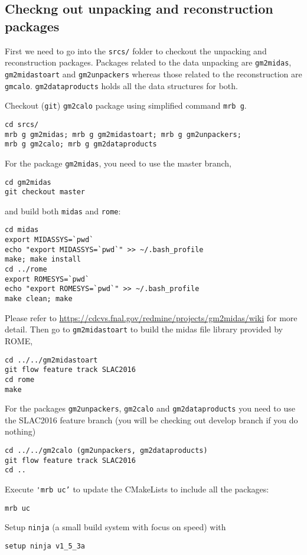 \subsection{Checkng out unpacking and reconstruction packages}
First we need to go into the \verb+srcs/+ folder to checkout the unpacking and reconstruction packages. 
Packages related to the data unpacking are \verb+gm2midas+, \verb+gm2midastoart+ and \verb+gm2unpackers+ whereas those related to the reconstruction are
\verb+gmcalo+. \verb+gm2dataproducts+ holds all the data structures for both.

Checkout (\verb+git+) \verb+gm2calo+ package using simplified command \verb+mrb g+.
%
\begin{Verbatim}[frame=single]
cd srcs/
mrb g gm2midas; mrb g gm2midastoart; mrb g gm2unpackers;
mrb g gm2calo; mrb g gm2dataproducts
\end{Verbatim}
%
For the package \verb+gm2midas+, you need to use the master branch,
%
\begin{Verbatim}[frame=single]
cd gm2midas
git checkout master
\end{Verbatim}
%
and build both \verb+midas+ and \verb+rome+:
%
\begin{Verbatim}[frame=single]
cd midas
export MIDASSYS=`pwd`
echo "export MIDASSYS=`pwd`" >> ~/.bash_profile
make; make install
cd ../rome
export ROMESYS=`pwd`
echo "export ROMESYS=`pwd`" >> ~/.bash_profile
make clean; make
\end{Verbatim}
%
Please refer to \url{https://cdcvs.fnal.gov/redmine/projects/gm2midas/wiki} for more detail.
Then go to \verb+gm2midastoart+ to build the midas file library provided by ROME,
%
\begin{Verbatim}[frame=single]
cd ../../gm2midastoart
git flow feature track SLAC2016
cd rome
make
\end{Verbatim}
%
For the packages \verb+gm2unpackers+, \verb+gm2calo+ and \verb+gm2dataproducts+
you need to use the SLAC2016 feature branch (you will be checking out develop branch if you do nothing)
%
\begin{Verbatim}[frame=single]
cd ../../gm2calo (gm2unpackers, gm2dataproducts)
git flow feature track SLAC2016
cd ..
\end{Verbatim}
%
Execute \verb+'mrb uc’+ to update the CMakeLists to include all the packages:
%
\begin{Verbatim}[frame=single]
mrb uc
\end{Verbatim}
%
Setup \verb+ninja+ (a small build system with focus on speed) with
%
\begin{Verbatim}[frame=single]
setup ninja v1_5_3a
\end{Verbatim}
